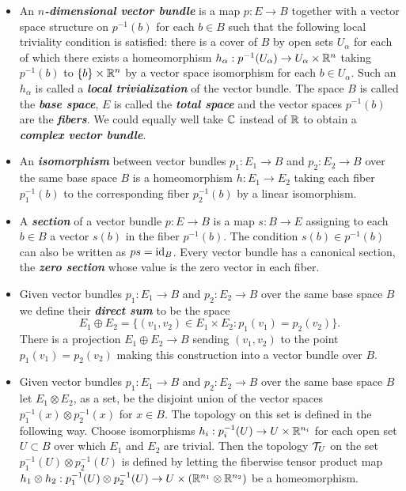 \begin{defn}\leavevmode
	\begin{itemize}
		\item An \textbf{\textit{$n$-dimensional vector bundle}} is a map $p:E\to B$ together with a vector space structure on $p^{-1}(b)$ for each $b\in B$ such that the following local triviality condition is satisfied: there is a cover of $B$ by open sets $U_\alpha$ for each of which there exists a homeomorphism $h_\alpha:p^{-1}(U_\alpha)\to U_\alpha\times\mathbb{R}^n$ taking $p^{-1}(b)$ to $\{b\}\times\mathbb{R}^n$ by a vector space isomorphism for each $b\in U_\alpha$. Such an $h_\alpha$ is called a \textbf{\textit{local trivialization}} of the vector bundle. The space $B$ is called the \textbf{\textit{base space}}, $E$ is called the \textbf{\textit{total space}} and the vector spaces $p^{-1}(b)$ are the \textbf{\textit{fibers}}. We could equally well take $\mathbb{C}$ instead of $\mathbb{R}$ to obtain a \textbf{\textit{complex vector bundle}}.
		
		\item An \textbf{\textit{isomorphism}} between vector bundles $p_1:E_1\to B$ and $p_2:E_2\to B$ over the same base space $B$ is a homeomorphism $h:E_1\to E_2$ taking each fiber $p_1^{-1}(b)$ to the corresponding fiber $p_2^{-1}(b)$ by a linear isomorphism.
		
		\item A \textbf{\textit{section}} of a vector bundle $p:E\to B$ is a map $s:B\to E$ assigning to each $b\in B$ a vector $s(b)$ in the fiber $p^{-1}(b)$. The condition $s(b)\in p^{-1}(b)$ can also be written as $ps=\operatorname{id}_B$. Every vector bundle has a canonical section, the \textbf{\textit{zero section}} whose value is the zero vector in each fiber.
		
		\item Given vector bundles $p_1:E_1\to B$ and $p_2:E_2\to B$ over the same base space $B$ we define their \textbf{\textit{direct sum}} to be the space
		\[E_1\oplus E_2=\{(v_1,v_2)\in E_1\times E_2:p_1(v_1)=p_2(v_2)\}.\]
		There is a projection $E_1\oplus E_2\to B$ sending $(v_1,v_2)$ to the point $p_1(v_1)=p_2(v_2)$ making this construction into a vector bundle over $B$.
		
		\item Given vector bundles $p_1:E_1\to B$ and $p_2:E_2\to B$ over the same base space $B$ let $E_1\otimes E_2$, as a set, be the disjoint union of the vector spaces $p_1^{-1}(x)\otimes p_2^{-1}(x)$ for $x\in B$. The topology on this set is defined in the following way. Choose isomorphisms $h_i:p_i^{-1}(U)\to U\times\mathbb{R}^{n_i}$ for each open set $U\subset B$ over which $E_1$ and $E_2$ are trivial. Then the topology $\mathcal{T}_U$ on the set $p_1^{-1}(U)\otimes p_2^{-1}(U)$ is defined by letting the fiberwise tensor product map $h_1\otimes h_2:p_1^{-1}(U)\otimes p_2^{-1}(U)\to U\times (\mathbb{R}^{n_1}\otimes\mathbb{R}^{n_2})$ be a homeomorphism.
		

\end{itemize}
\end{defn}
